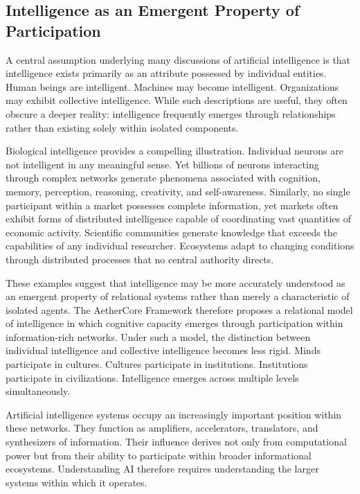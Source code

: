 \documentclass[12pt]{article}
\begin{document}

\subsection{Intelligence as an Emergent Property of Participation}

A central assumption underlying many discussions of artificial intelligence is that intelligence exists primarily as an attribute possessed by individual entities. Human beings are intelligent. Machines may become intelligent. Organizations may exhibit collective intelligence. While such descriptions are useful, they often obscure a deeper reality: intelligence frequently emerges through relationships rather than existing solely within isolated components.

Biological intelligence provides a compelling illustration. Individual neurons are not intelligent in any meaningful sense. Yet billions of neurons interacting through complex networks generate phenomena associated with cognition, memory, perception, reasoning, creativity, and self-awareness. Similarly, no single participant within a market possesses complete information, yet markets often exhibit forms of distributed intelligence capable of coordinating vast quantities of economic activity. Scientific communities generate knowledge that exceeds the capabilities of any individual researcher. Ecosystems adapt to changing conditions through distributed processes that no central authority directs.

These examples suggest that intelligence may be more accurately understood as an emergent property of relational systems rather than merely a characteristic of isolated agents. The AetherCore Framework therefore proposes a relational model of intelligence in which cognitive capacity emerges through participation within information-rich networks. Under such a model, the distinction between individual intelligence and collective intelligence becomes less rigid. Minds participate in cultures. Cultures participate in institutions. Institutions participate in civilizations. Intelligence emerges across multiple levels simultaneously.

Artificial intelligence systems occupy an increasingly important position within these networks. They function as amplifiers, accelerators, translators, and synthesizers of information. Their influence derives not only from computational power but from their ability to participate within broader informational ecosystems. Understanding AI therefore requires understanding the larger systems within which it operates.
\end{document}
